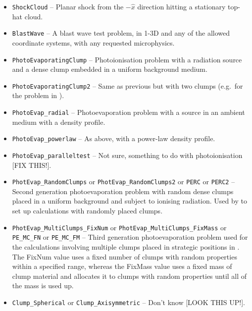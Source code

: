 \documentclass[a4paper,11pt]{report}
\begin{document}
\begin{itemize}
  \item \verb|ShockCloud| -- Planar shock from the $-\hat{x}$ direction hitting a stationary top-hat cloud.
  \item \verb|BlastWave| -- A blast wave test problem, in 1-3D and any of the allowed coordinate systems, with any requested microphysics.
  \item \verb|PhotoEvaporatingClump| -- Photoionisation problem with a radiation source and a dense clump embedded in a uniform background medium.
  \item \verb|PhotoEvaporatingClump2| -- Same as previous but with two clumps (e.g.\ for the problem in \citealt{LimMel03}).
  \item \verb|PhotoEvap_radial| -- Photoevaporation problem with a source in an ambient medium with a density profile.
  \item \verb|PhotoEvap_powerlaw| -- As above, with a power-law density profile.
  \item \verb|PhotoEvap_paralleltest| -- Not sure, something to do with photoionisation [FIX THIS!].
  \item \verb|PhotEvap_RandomClumps| or \verb|PhotEvap_RandomClumps2| or \verb|PERC| or \verb|PERC2| -- Second generation photoevaporation problem with random dense clumps placed in a uniform background and subject to ionising radiation.  Used by \citet{MacLim10} to set up calculations with randomly placed clumps.
  \item \verb|PhotEvap_MultiClumps_FixNum| or \verb|PhotEvap_MultiClumps_FixMass| or \verb|PE_MC_FN| or \verb|PE_MC_FM| -- Third generation photoevaporation problem used for the calculations involving multiple clumps placed in strategic positions in \citet{MacLim10,MacLim11b}.  The FixNum value uses a fixed number of clumps with random properties within a specified range, whereas the FixMass value uses a fixed mass of clump material and allocates it to clumps with random properties until all of the mass is used up.
  \item \verb|Clump_Spherical| or \verb|Clump_Axisymmetric| -- Don't know [LOOK THIS UP!].
\end{itemize}



\end{document}
